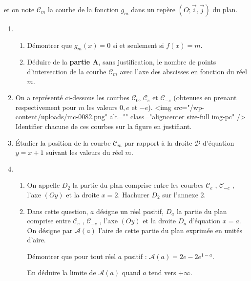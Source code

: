 et on note $\mathscr C_{m}$ la courbe de la fonction $g_{m}$ dans un repère $\left(O; \vec{i}, \vec{j}\right)$ du plan.
\begin{enumerate}
     \item
     \begin{enumerate}[label=\alph*.]
          \item
          Démontrer que $g_{m}\left(x\right)=0$ si et seulement si $f\left(x\right)=m$.
          \item
     Déduire de la \textbf{partie A}, sans justification, le nombre de points d'intersection de la courbe $\mathscr C_{m}$ avec l'axe des abscisses en fonction du réel $m$.\end{enumerate}
     \item
     On a représenté ci-dessous les courbes $\mathscr C_{0}$, $\mathscr C_{e}$ et $\mathscr C_{-e}$ (obtenues en prenant respectivement pour $m$ les valeurs $0, e$ et $-e$).
     <img src="/wp-content/uploads/mc-0082.png" alt="" class="aligncenter size-full  img-pc" />
     Identifier chacune de ces courbes sur la figure en justifiant.
     \item
     Étudier la position de la courbe $\mathscr C_{m}$ par rapport à la droite $\mathscr D$ d'équation $y=x+1$ suivant les valeurs du réel $m$.
     \item
     \begin{enumerate}[label=\alph*.]
          \item
          On appelle $D_{2}$ la partie du plan comprise entre les courbes $\mathscr C_{e}$ , $\mathscr C_{-e}$ , l'axe $\left(Oy\right)$ et la droite $x=2$. Hachurer $D_{2}$ sur l'annexe 2.
          \item
          Dans cette question, $a$ désigne un réel positif, $D_{a}$ la partie du plan comprise entre $\mathscr C_{e}$ , $\mathscr C_{-e}$ , l'axe $\left(Oy\right)$ et la droite $D_{a}$ d'équation $x=a$. On désigne par $\mathscr A\left(a\right)$ l'aire de cette partie du plan exprimée en unités d'aire.
          \par
          Démontrer que pour tout réel $a$ positif : $\mathscr A\left(a\right)=2e-2e^{1-a}$.
          \par
     En déduire la limite de $\mathscr A\left(a\right)$ quand $a$ tend vers $+ \infty $.\end{enumerate}
\end{enumerate}
